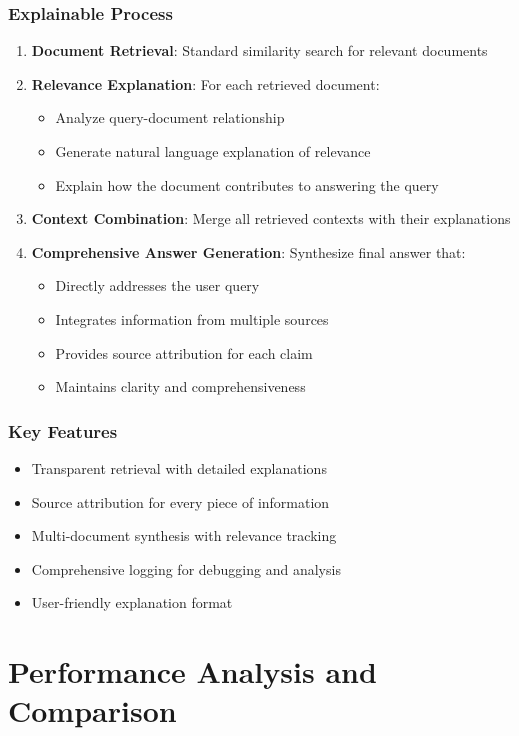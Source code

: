 \documentclass[12pt,a4paper]{article}
\begin{document}
\subsubsection{Explainable Process}
\begin{enumerate}
    \item \textbf{Document Retrieval}: Standard similarity search for relevant documents
    \item \textbf{Relevance Explanation}: For each retrieved document:
    \begin{itemize}
        \item Analyze query-document relationship
        \item Generate natural language explanation of relevance
        \item Explain how the document contributes to answering the query
    \end{itemize}
    \item \textbf{Context Combination}: Merge all retrieved contexts with their explanations
    \item \textbf{Comprehensive Answer Generation}: Synthesize final answer that:
    \begin{itemize}
        \item Directly addresses the user query
        \item Integrates information from multiple sources
        \item Provides source attribution for each claim
        \item Maintains clarity and comprehensiveness
    \end{itemize}
\end{enumerate}

\subsubsection{Key Features}
\begin{itemize}
    \item Transparent retrieval with detailed explanations
    \item Source attribution for every piece of information
    \item Multi-document synthesis with relevance tracking
    \item Comprehensive logging for debugging and analysis
    \item User-friendly explanation format
\end{itemize}

\section{Performance Analysis and Comparison}
\end{document}
